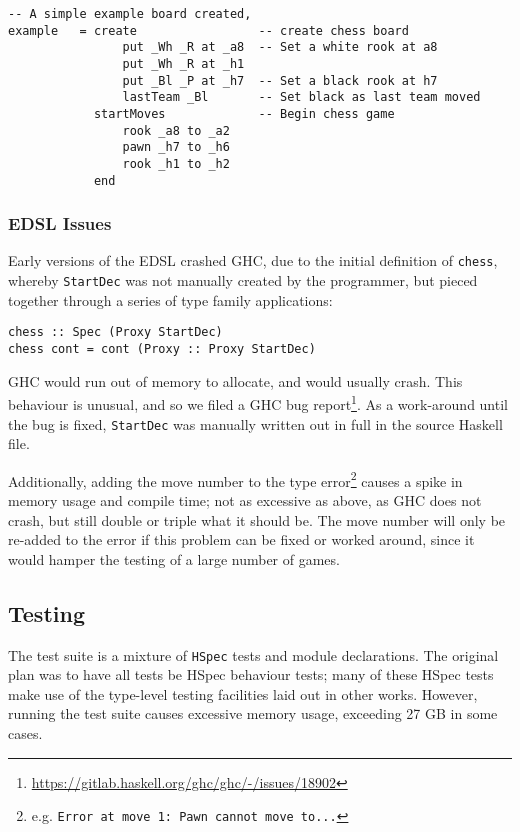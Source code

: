 \documentclass[12pt, a4paper]{scrartcl}
\begin{document}
\begin{lstlisting}
-- A simple example board created, 
example   = create                 -- create chess board
                put _Wh _R at _a8  -- Set a white rook at a8
                put _Wh _R at _h1
                put _Bl _P at _h7  -- Set a black rook at h7
                lastTeam _Bl       -- Set black as last team moved
            startMoves             -- Begin chess game
                rook _a8 to _a2
                pawn _h7 to _h6
                rook _h1 to _h2
            end
\end{lstlisting}

\subsubsection{EDSL Issues}

Early versions of the EDSL crashed GHC, due to the initial definition of \lstinline{chess}, whereby \lstinline{StartDec} was not manually created by the programmer, but pieced together through a series of type family applications:

\begin{lstlisting}
chess :: Spec (Proxy StartDec)
chess cont = cont (Proxy :: Proxy StartDec)
\end{lstlisting}

GHC would run out of memory to allocate, and would usually crash. This behaviour is unusual, and so we filed a GHC bug report\footnote{\url{https://gitlab.haskell.org/ghc/ghc/-/issues/18902}}. As a work-around until the bug is fixed, \lstinline{StartDec} was manually written out in full in the source Haskell file.

Additionally, adding the move number to the type error\footnote{e.g. \lstinline{Error at move 1: Pawn cannot move to...}} causes a spike in memory usage and compile time; not as excessive as above, as GHC does not crash, but still double or triple what it should be. The move number will only be re-added to the error if this problem can be fixed or worked around, since it would hamper the testing of a large number of games.

\subsection{Testing}

The test suite is a mixture of \lstinline{HSpec} tests\cite{hspec} and module declarations. The original plan was to have all tests be HSpec behaviour tests; many of these HSpec tests make use of the type-level testing facilities laid out in other works\cite{mezzo}. However, running the test suite causes excessive memory usage, exceeding 27 GB in some cases.
\end{document}
